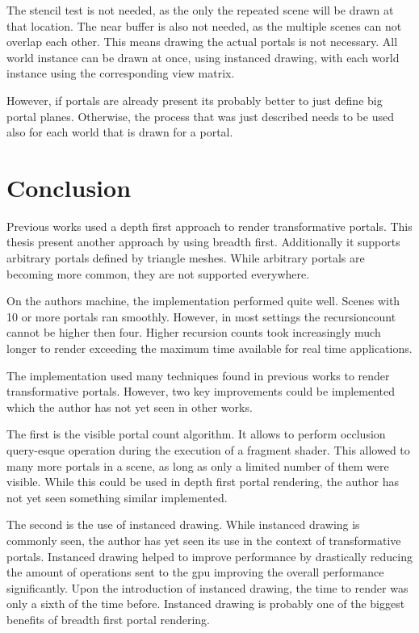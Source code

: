 The stencil test is not needed, as the only the repeated scene will be drawn at that location. The near buffer is also not needed, as the multiple scenes can not overlap each other. This means drawing the actual portals is not necessary. All world instance can be drawn at once, using instanced drawing, with each world instance using the corresponding view matrix.

However, if portals are already present its probably better to just define big portal planes. Otherwise, the process that was just described needs to be used also for each world that is drawn for a portal.


\chapter{Conclusion}


Previous works used a depth first approach to render transformative portals. This thesis present another approach by using breadth first. Additionally it supports arbitrary portals defined by triangle meshes. While arbitrary portals are becoming more common, they are not supported everywhere.

On the authors machine, the implementation performed quite well. Scenes with 10 or more portals ran smoothly. However, in most settings the \gls{recursioncount} cannot be higher then four. Higher recursion counts took increasingly much longer to render exceeding the maximum time available for real time applications.



The implementation used many techniques found in previous works to render transformative portals. However, two key improvements could be implemented which the author has not yet seen in other works.

The first is the visible portal count algorithm. It allows to perform occlusion query-esque operation during the execution of a fragment shader. This allowed to many more portals in a scene, as long as only a limited number of them were visible. While this could be used in depth first portal rendering, the author has not yet seen something similar implemented.

The second is the use of instanced drawing. While instanced drawing is commonly seen, the author has yet seen its use in the context of transformative portals. Instanced drawing helped to improve performance by drastically reducing the amount of operations sent to the \gls{gpu} improving the overall performance significantly. Upon the introduction of instanced drawing, the time to render was only a sixth of the time before. Instanced drawing is probably one of the biggest benefits of breadth first portal rendering.

